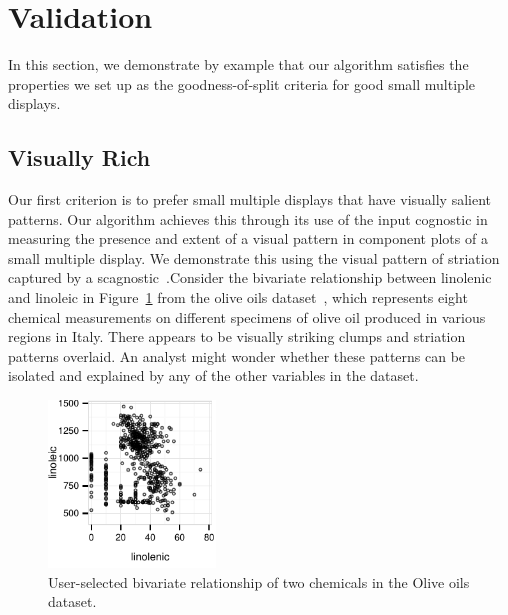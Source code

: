 \section{Validation}
\label{sec:evaluation}
In this section, we demonstrate by example that our algorithm satisfies the properties we set up as the goodness-of-split criteria for good small multiple displays.


\subsection{Visually Rich}
Our first criterion is to prefer small multiple displays that have visually salient patterns. Our algorithm achieves this through its use of the input cognostic  in measuring the presence and extent of a visual pattern in component plots of a small multiple display. 
We demonstrate this using the visual pattern of striation captured by a scagnostic~\cite{Wilkinson2005}.Consider the bivariate relationship between linolenic and linoleic in Figure~\ref{fig:vrich_all} from the olive oils dataset~\cite{Forina1983}, which represents eight chemical measurements on different specimens of olive oil produced in various regions in Italy. There appears to be visually striking clumps and striation patterns overlaid. An analyst might wonder whether these patterns can be isolated and explained by any of the other variables in the dataset.

\begin{figure}
 \centering 
	\includegraphics[width=1.75in]{images/linolenic-linoleic.pdf}
	  \caption{User-selected bivariate relationship of two chemicals in the Olive oils dataset. }
	 \label{fig:vrich_all}
\end{figure}

